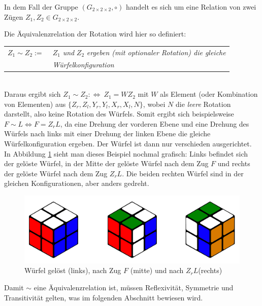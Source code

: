 \documentclass[12pt,a4paper, usenames, dvipsnames]{article}
\newcommand{\Gtwo}{\ensuremath{G_{2\times 2\times 2}}}
\begin{document}
In dem Fall der Gruppe $(\Gtwo, \circ)$ handelt es sich um eine Relation von zwei Zügen $Z_1, Z_2 \in \Gtwo$. 

Die Äquivalenzrelation der Rotation wird hier so definiert: 


\begin{tabular}{l l}
$Z_1 \sim Z_2 := \ $  & $Z_1$ \textit{und} $Z_2$ \textit{ergeben (mit optionaler Rotation) die gleiche }\\
\  & \textit{Würfelkonfiguration} \\
\end{tabular} 
\\

Daraus ergibt sich $Z_1 \sim Z_2 :\Leftrightarrow \ Z_1 = WZ_2$ mit $W$ als Element (oder Kombination von Elementen) aus $\{{Z_r}, {Z_l}, {Y_r}, {Y_l}, {X_r}, {X_l}, N\}$, wobei $N$ die \textit{leere} Rotation darstellt, also keine Rotation des Würfels. 
Somit ergibt sich beispielsweise $F \sim L \Leftrightarrow F = Z_rL$, da eine Drehung der vorderen Ebene und eine Drehung des Würfels nach links mit einer Drehung der linken Ebene die gleiche Würfelkonfiguration ergeben. Der Würfel ist dann nur verschieden ausgerichtet. 
In Abbildung \ref{1} sieht man dieses Beispiel nochmal grafisch: Links befindet sich der gelöste Würfel, in der Mitte der gelöste Würfel nach dem Zug $F$ und rechts der gelöste Würfel nach dem Zug $Z_rL$. Die beiden rechten Würfel sind in der gleichen Konfigurationen, aber anders gedreht.
\begin{figure}[h]
\centering
\includegraphics[scale=0.15]{3_wuerfel.png}
\caption[Würfel gelöst, nach Zug $F$ und nach $Z_rL$]{Würfel gelöst (links), nach Zug $F$ (mitte) und nach $Z_rL$(rechts)}
\label{1}
\end{figure}

Damit $\sim$ eine Äquivalenzrelation ist, müssen Reflexivität, Symmetrie und Transitivität gelten, was im folgenden Abschnitt bewiesen wird.
\end{document}
